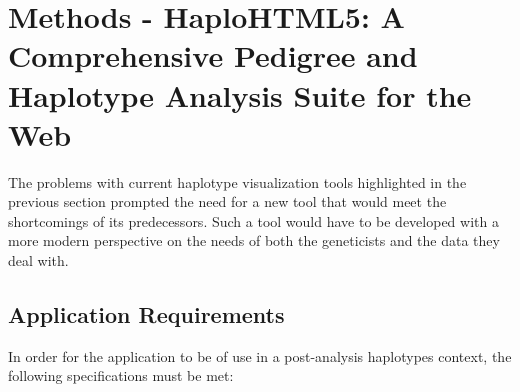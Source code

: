 \chapter{Methods - HaploHTML5: A Comprehensive Pedigree and Haplotype Analysis Suite for the Web}

The problems with current haplotype visualization tools highlighted in the previous section prompted the need for a new tool that would meet the shortcomings of its predecessors. Such a tool would have to be developed with a more modern perspective on the needs of both the geneticists and the data they deal with.

\section{Application Requirements}

In order for the application to be of use in a post-analysis haplotypes context, the following specifications must be met:

